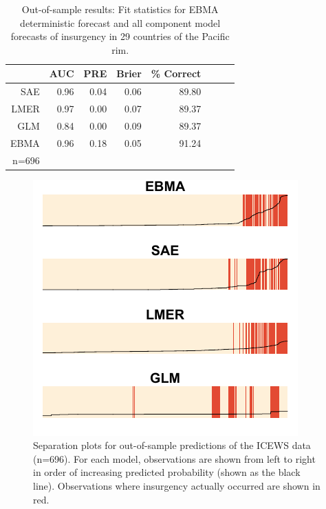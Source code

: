 \documentclass[pdftex,12pt,fullpage,oneside]{amsart}
\begin{document}
\begin{table}[h!]
\begin{center}
\caption{\footnotesize Out-of-sample results: Fit statistics for EBMA
    deterministic forecast and all component model forecasts of
    insurgency in 29 countries of the Pacific rim.}\label{OutSam1}
\begin{tabular}{rrrrrrrr}
  \toprule
 & AUC & PRE & Brier & \% Correct \\ 
  \midrule
  SAE &  0.96 & 0.04 & 0.06 & 89.80 \\ 
  LMER & 0.97 & 0.00 & 0.07 & 89.37 \\ 
  GLM & 0.84 & 0.00 & 0.09 & 89.37 \\ 
  EBMA & 0.96 & 0.18 & 0.05 & 91.24 \\ 
   \bottomrule
n=696 \\
\end{tabular}
\end{center}
\end{table}

\begin{figure}
\caption{\footnotesize Separation plots for out-of-sample predictions of the ICEWS
  data (n=696).  For each model,
  observations are shown from left to right in order of increasing
  predicted probability (shown as the black line).  Observations where
insurgency actually occurred are shown in red.}
\label{OutSam1sep}
\begin{center}
\includegraphics[scale =.4]{OutSampleNew.pdf}
\end{center}
\end{figure}
\end{document}

